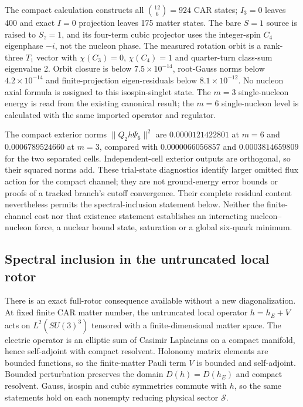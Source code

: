 \documentclass[11pt]{article}
\begin{document}
The compact calculation constructs all $\binom{12}{6}=924$ CAR states; $I_3=0$ leaves 400 and exact $I=0$ projection leaves 175 matter states. The bare $S=1$ source is raised to $S_z=1$, and its four-term cubic projector uses the integer-spin $C_4$ eigenphase $-i$, not the nucleon phase. The measured rotation orbit is a rank-three $T_1$ vector with $\chi(C_3)=0$, $\chi(C_4)=1$ and quarter-turn class-sum eigenvalue 2. Orbit closure is below $7.5\times10^{-14}$, root-Gauss norms below $4.2\times10^{-14}$ and finite-projection eigen-residuals below $8.1\times10^{-12}$. No nucleon axial formula is assigned to this isospin-singlet state. The $m=3$ single-nucleon energy is read from the existing canonical result; the $m=6$ single-nucleon level is calculated with the same imported operator and regulator.

The compact exterior norms $\|Q_2h\Psi_6\|^2$ are $0.0000121422801$ at $m=6$ and $0.0006789524660$ at $m=3$, compared with $0.0000066056857$ and $0.0003814659809$ for the two separated cells. Independent-cell exterior outputs are orthogonal, so their squared norms add. These trial-state diagnostics identify larger omitted flux action for the compact channel; they are not ground-energy error bounds or proofs of a tracked branch's cutoff convergence. Their complete residual content nevertheless permits the spectral-inclusion statement below. Neither the finite-channel cost nor that existence statement establishes an interacting nucleon--nucleon force, a nuclear bound state, saturation or a global six-quark minimum.

\subsection{Spectral inclusion in the untruncated local rotor}
There is an exact full-rotor consequence available without a new diagonalization. At fixed finite CAR matter number, the untruncated local operator $h=h_E+V$ acts on $L^2(SU(3)^3)$ tensored with a finite-dimensional matter space. The electric operator is an elliptic sum of Casimir Laplacians on a compact manifold, hence self-adjoint with compact resolvent. Holonomy matrix elements are bounded functions, so the finite-matter Pauli term $V$ is bounded and self-adjoint. Bounded perturbation preserves the domain $D(h)=D(h_E)$ and compact resolvent. Gauss, isospin and cubic symmetries commute with $h$, so the same statements hold on each nonempty reducing physical sector $\mathcal S$.
\end{document}
